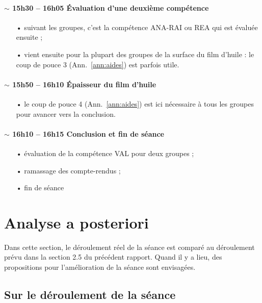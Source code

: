 \documentclass[12pt,a4paper, fleqn]{report}
\newcommand{\rea}{\colorbox{yellow_c}{\textcolor{yellow_f}{REA}}}
\newcommand{\anarai}{\colorbox{green_c}{\textcolor{green_f}{ANA-RAI}}}
\newcommand{\val}{\colorbox{orange_c}{\textcolor{orange_f}{VAL}}}
\begin{document}
\paragraph{$\sim$ 15h30 -- 16h05 Évaluation d'une deuxième compétence}
\begin{itemize}
\item[•] suivant les groupes, c'est la compétence \anarai{} ou \rea{} qui est évaluée ensuite ;
\item[•] vient ensuite pour la plupart des groupes de la surface du film d'huile : le coup de pouce 3 (Ann.~\ref{ann:aides}) est parfois utile.
\end{itemize}

\paragraph{$\sim$ 15h50 -- 16h10 Épaisseur du film d'huile}
\begin{itemize}
\item[•] le coup de pouce 4 (Ann.~\ref{ann:aides}) est ici nécessaire à tous les groupes pour avancer vers la conclusion.
\end{itemize}

\paragraph{$\sim$ 16h10 -- 16h15 Conclusion et fin de séance}
\begin{itemize}
\item[•] évaluation de la compétence \val{} pour deux groupes ;
\item[•] ramassage des compte-rendus ;
\item[•] fin de séance
\end{itemize}

\section{Analyse a posteriori}

Dans cette section, le déroulement réel de la séance est comparé au déroulement prévu dans la section 2.5 du précédent rapport.
Quand il y a lieu, des propositions pour l'amélioration de la séance sont envisagées.

\subsection{Sur le déroulement de la séance}
\end{document}
